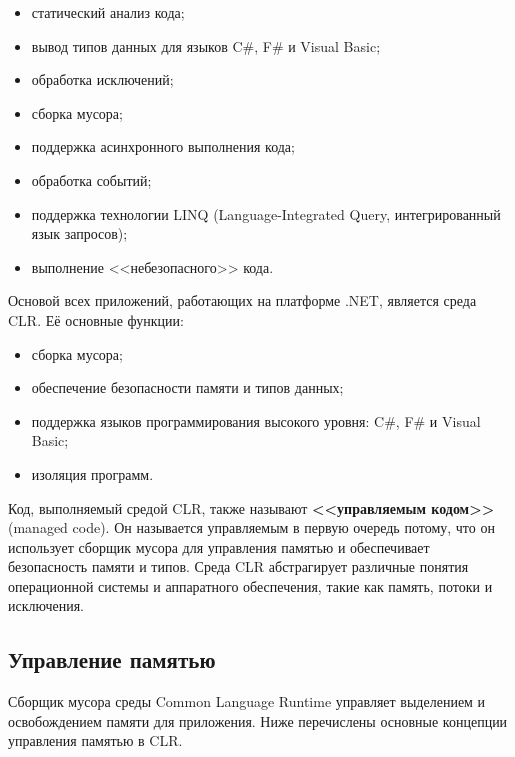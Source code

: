 \begin{itemize}[label*=---]
	\item статический анализ кода;
	\item вывод типов данных для языков C\#, F\# и Visual Basic;
	\item обработка исключений;
	\item сборка мусора;
	\item поддержка асинхронного выполнения кода;
	\item обработка событий;
	\item поддержка технологии LINQ (Language-Integrated Query, интегрированный язык запросов);
	\item выполнение <<небезопасного>> кода. \cite{dotnet_unsafe} %
\end{itemize}

Основой всех приложений, работающих на платформе .NET, является среда CLR. Её основные функции: \cite{dotnet_intro} \cite{dotnet_clr_intro}

\begin{itemize}[label*=---]
	\item сборка мусора;
	\item обеспечение безопасности памяти и типов данных;
	\item поддержка языков программирования высокого уровня: C\#, F\# и Visual Basic;
	\item изоляция программ.
\end{itemize}

Код, выполняемый средой CLR, также называют \textbf{<<управляемым кодом>>} (managed code).
Он называется управляемым в первую очередь потому, что он использует сборщик мусора для управления памятью и обеспечивает безопасность памяти и типов. Среда CLR абстрагирует различные понятия операционной системы и аппаратного обеспечения, такие как память, потоки и исключения. \cite{dotnet_code}



\subsection{Управление памятью}

Сборщик мусора среды Common Language Runtime управляет выделением и освобождением памяти для приложения. Ниже перечислены основные концепции управления памятью в CLR. \cite{dotnet_gc}

